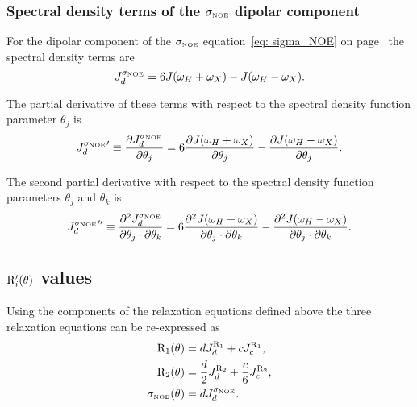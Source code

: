 \subsubsection{Spectral density terms of the $\sigma_{\scriptscriptstyle \mathrm{NOE}}$ dipolar component}

For the dipolar component of the $\sigma_{\scriptscriptstyle \mathrm{NOE}}$ equation~\eqref{eq: sigma_NOE} on page~\pageref{eq: sigma_NOE} the spectral density terms are
\begin{equation}
    J_d^{\sigma_{\scriptscriptstyle \mathrm{NOE}}} = 6J(\omega_H + \omega_X) - J(\omega_H - \omega_X).  \label{eq: J terms: JsigmaNOEd}
\end{equation}

\noindent The partial derivative of these terms with respect to the spectral density function parameter $\theta_j$ is
\begin{equation}
    {J_d^{\sigma_{\scriptscriptstyle \mathrm{NOE}}}}' \equiv \frac{\partial J_d^{\sigma_{\scriptscriptstyle \mathrm{NOE}}}}{\partial \theta_j}
        = 6 \frac{\partial J(\omega_H + \omega_X)}{\partial \theta_j}
          - \frac{\partial J(\omega_H - \omega_X)}{\partial \theta_j}.  \label{eq: J terms: JsigmaNOEd'}
\end{equation}

\noindent The second partial derivative with respect to the spectral density function parameters $\theta_j$ and $\theta_k$ is
\begin{equation}
    {J_d^{\sigma_{\scriptscriptstyle \mathrm{NOE}}}}'' \equiv \frac{\partial^2 J_d^{\sigma_{\scriptscriptstyle \mathrm{NOE}}}}{\partial \theta_j \cdot \partial \theta_k}
        = 6 \frac{\partial^2 J(\omega_H + \omega_X)}{\partial \theta_j \cdot \partial \theta_k}
          - \frac{\partial^2 J(\omega_H - \omega_X)}{\partial \theta_j \cdot \partial \theta_k}.  \label{eq: J terms: JsigmaNOEd"}
\end{equation}




\subsection{$\mathrm{R}_i'(\theta)$ values}

Using the components of the relaxation equations defined above the three relaxation equations can be re-expressed as
\begin{subequations}
\begin{align}
    \mathrm{R}_1(\theta) & = d J_d^{\mathrm{R}_1} + c J_c^{\mathrm{R}_1},                          \label{eq: Ri': R1} \\
    \mathrm{R}_2(\theta) & = \frac{d}{2} J_d^{\mathrm{R}_2} + \frac{c}{6} J_c^{\mathrm{R}_2},      \label{eq: Ri': R2} \\
    \sigma_{\scriptscriptstyle \mathrm{NOE}}(\theta) & = d J_d^{\sigma_{\scriptscriptstyle \mathrm{NOE}}}.                          \label{eq: Ri': sigmaNOE}
\end{align}
\end{subequations}



